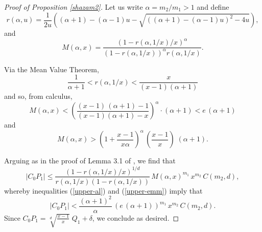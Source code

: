 \begin{proof}[Proof of Proposition \ref{shazam2}]
Let us write $\alpha = m_2/m_1>1$
and define
\begin{equation} \label{arrr}
r (\alpha,  u) =
\frac{1}{2u} \left( (\alpha + 1) - (\alpha - 1) u - \sqrt{\left((\alpha + 1) - (\alpha - 1) u \right)^2 - 4 u} \right),
\end{equation}
and
\begin{equation} \label{emm}
M(\alpha,x) =  \frac{(1-r(\alpha,1/x)/x)^{\alpha}}{(1-r(\alpha,1/x))^{\alpha} r(\alpha,1/x)}.
\end{equation}

Via the Mean Value Theorem, 
\begin{equation} \label{upper-al}
 \frac{1}{\alpha +1}  < r(\alpha,1/x) < \frac{x}{(x-1)(\alpha +1)}
\end{equation}
and so, from calculus,
\begin{equation} \label{upper-emm}
M(\alpha,x) < \left( \frac{(x-1) \, (\alpha+1)-1}{(x-1) (\alpha +1)-x} \right)^\alpha \cdot (\alpha+1) < e \, (\alpha +1)
\end{equation}
and
\begin{equation} \label{M-lower}
M(\alpha,x) > \left( 1 + \frac{x-1}{x \alpha} \right)^\alpha \, \left( \frac{x-1}{x} \right) \; (\alpha+1).
\end{equation}

Arguing as in the proof of Lemma 3.1 of \cite{BaBe}, we find that 
$$
|C_0 P_1| \leq \frac{\left( 1-r(\alpha,1/x)/x \right)^{1/d}}{r(\alpha, 1/x) (1 - r(\alpha,1/x))} \, M(\alpha,x)^{m_1} \, x^{m_2} \, C(m_2,d),
$$
whereby inequalities (\ref{upper-al}) and  (\ref{upper-emm}) imply that
$$
|C_0 P_1| < \frac{(\alpha+1)^2}{\alpha} \, (e \, (\alpha + 1))^{m_1}  \, x^{m_2} \, C(m_2,d).
$$
Since $C_0 P_1 = \sqrt[d]{\frac{x-1}{x}} \; Q_1 + \delta$, we conclude as desired.
\end{proof}

